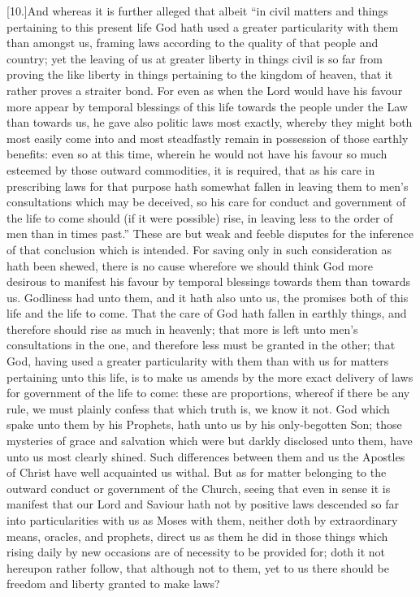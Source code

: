 [10.]And whereas it is further alleged that albeit “in civil matters and things pertaining to this present life God hath used a greater particularity with them than amongst us, framing laws according to the quality of that people and country; yet the leaving of us at greater liberty in things civil is so far from proving the like liberty in things pertaining to the kingdom of heaven, that it rather proves a straiter bond. For even as when the Lord would have his favour more appear by temporal blessings of this life towards the people under the Law than towards us, he gave also politic laws most exactly, whereby they might both most easily come into and most steadfastly remain in possession of those earthly benefits: even so at this time, wherein he would not have his favour so much esteemed by those outward commodities, it is required, that as his care in prescribing laws for that purpose hath somewhat fallen in leaving them to men’s consultations which may be deceived, so his care for conduct and government of the life to come should (if it were possible) rise, in leaving less to the order of men than in times past.” These are but weak and feeble disputes for the inference of that conclusion which is intended. For  saving only in such consideration as hath been shewed, there is no cause wherefore we should think God more desirous to manifest his favour by temporal blessings towards them than towards us. Godliness had unto them, and it hath also unto us, the promises both of this life and the life to come. That the care of God hath fallen in earthly things, and therefore should rise as much in heavenly; that more is left unto men’s consultations in the one, and therefore less must be granted in the other; that God, having used a greater particularity with them than with us for matters pertaining unto this life, is to make us amends by the more exact delivery of laws for government of the life to come: these are proportions, whereof if there be any rule, we must plainly confess that which truth is, we know it not. God which spake unto them by his Prophets, hath unto us by his only-begotten Son; those mysteries of grace and salvation which were but darkly disclosed unto them, have unto us most clearly shined. Such differences between them and us the Apostles of Christ have well acquainted us withal. But as for matter belonging to the outward conduct or government of the Church, seeing that even in sense it is manifest that our Lord and Saviour hath not by positive laws descended so far into particularities with us as Moses with them, neither doth by extraordinary means, oracles, and prophets, direct us as them he did in those things which rising daily by new occasions are of necessity to be provided for; doth it not hereupon rather follow, that although not to them, yet to us there should be freedom and liberty granted to make laws?

